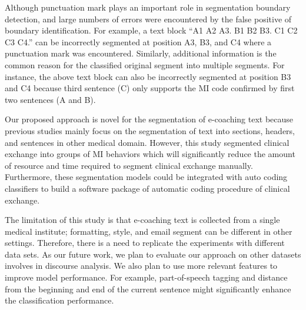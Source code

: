 \documentclass{amia}
\begin{document}
Although punctuation mark plays an important role in segmentation boundary detection, and large numbers of errors were encountered by the false positive of boundary identification. For example, a text block ``A1 A2 A3. B1 B2 B3. C1 C2 C3 C4.'' can be incorrectly segmented at position A3, B3, and C4 where a punctuation mark was encountered. Similarly, additional information is the common reason for the classified original segment into multiple segments. For instance, the above text block can also be incorrectly segmented at position B3 and C4 because third sentence (C) only supports the MI code confirmed by first two sentences (A and B). 

Our proposed approach is novel for the segmentation of e-coaching text because previous studies mainly focus on the segmentation of text into sections, headers, and sentences in other medical domain. However, this study segmented clinical exchange into groups of MI behaviors which will significantly reduce the amount of resource and time required to segment clinical exchange manually. Furthermore, these segmentation models could be integrated with auto coding classifiers to build a software package of automatic coding procedure of clinical exchange.

The limitation of this study is that e-coaching text is collected from a single medical institute; formatting, style, and email segment can be different in other settings. Therefore, there is a need to replicate the experiments with different data sets. As our future work, we plan to evaluate our approach on other datasets involves in discourse analysis. We also plan to use more relevant features to improve model performance. For example, part-of-speech tagging\cite{hasan2016feedback} and distance from the beginning and end of the current sentence might significantly enhance the classification performance. 
 
\end{document}
